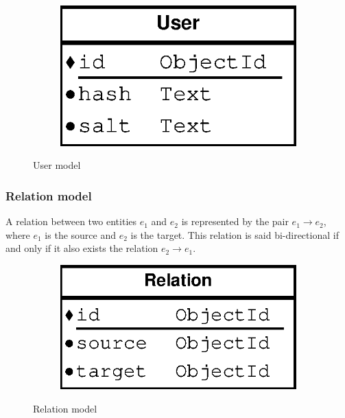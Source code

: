 \begin{figure}[H]
    \centering
    \begin{subfigure}[b]{0.25\textwidth}
    	\includegraphics[width=\textwidth]{figures/model_user}
    \end{subfigure}
    \caption{User model}
\end{figure} 

\subsubsection{Relation model}

A relation between two entities $e_1$ and $e_2$ is represented by the pair $e_1\rightarrow e_2$, where $e_1$ is the source and $e_2$ is the target. This relation is said bi-directional if and only if it also exists the relation $e_2\rightarrow e_1$.

\begin{figure}[H]
    \centering
    \begin{subfigure}[b]{0.3\textwidth}
    	\includegraphics[width=\textwidth]{figures/model_relation}
    \end{subfigure}
    \caption{Relation model}
\end{figure} 

